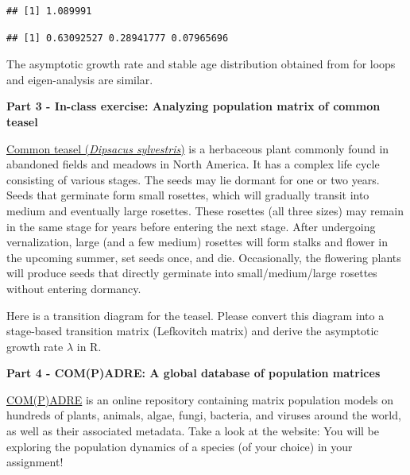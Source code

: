 \documentclass[
]{book}
\newenvironment{Shaded}{\begin{snugshade}}{\end{snugshade}}
\newcommand{\CommentTok}[1]{\textcolor[rgb]{0.56,0.35,0.01}{\textit{#1}}}
\newcommand{\DecValTok}[1]{\textcolor[rgb]{0.00,0.00,0.81}{#1}}
\newcommand{\FunctionTok}[1]{\textcolor[rgb]{0.13,0.29,0.53}{\textbf{#1}}}
\newcommand{\NormalTok}[1]{#1}
\newcommand{\SpecialCharTok}[1]{\textcolor[rgb]{0.81,0.36,0.00}{\textbf{#1}}}
\begin{document}
\begin{verbatim}
## [1] 1.089991
\end{verbatim}

\begin{Shaded}
\end{Shaded}

\begin{verbatim}
## [1] 0.63092527 0.28941777 0.07965696
\end{verbatim}

The asymptotic growth rate and stable age distribution obtained from for loops and eigen-analysis are similar.

\textbf{Part 3 - In-class exercise: Analyzing population matrix of common teasel}

\href{https://en.wikipedia.org/wiki/Dipsacus_fullonum}{Common teasel (\emph{Dipsacus sylvestris})} is a herbaceous plant commonly found in abandoned fields and meadows in North America. It has a complex life cycle consisting of various stages. The seeds may lie dormant for one or two years. Seeds that germinate form small rosettes, which will gradually transit into medium and eventually large rosettes. These rosettes (all three sizes) may remain in the same stage for years before entering the next stage. After undergoing vernalization, large (and a few medium) rosettes will form stalks and flower in the upcoming summer, set seeds once, and die. Occasionally, the flowering plants will produce seeds that directly germinate into small/medium/large rosettes without entering dormancy.

Here is a transition diagram for the teasel. Please convert this diagram into a stage-based transition matrix (Lefkovitch matrix) and derive the asymptotic growth rate \(\lambda\) in R.

\textbf{Part 4 - COM(P)ADRE: A global database of population matrices}

\href{https://compadre-db.org/ExploreDatabase}{COM(P)ADRE} is an online repository containing matrix population models on hundreds of plants, animals, algae, fungi, bacteria, and viruses around the world, as well as their associated metadata. Take a look at the website: You will be exploring the population dynamics of a species (of your choice) in your assignment!

  
\end{document}
